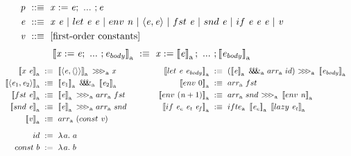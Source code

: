 \documentclass{llncs}
\newcommand{\arrowarr}{\ensuremath{arr}}
\newcommand{\arrowcomp}{\ensuremath{{>}\mspace{-6mu}{>}\mspace{-6mu}{>}}}
\newcommand{\arrowpair}{\ensuremath{\mathit{\&\mspace{-7.5mu}\&\mspace{-7.5mu}\&}}}
\newcommand{\arrowif}{\ensuremath{ifte}}
\newcommand{\gen}{_\mathrm{a}}
\begin{document}
\begin{figure*}[t]
\smallmathfont
\begin{align*}
	\mathit{p} &\ ::\equiv \ \mathit{x := e};\ ...\ ; \mathit{e} \\
	\mathit{e} &\ ::\equiv \ \mathit{x~e}\ |\ let~\mathit{e~e}\ |\ env~\mathit{n}\ |\ \mathit{\pair{e,e}}\ |\ fst~\mathit{e}\ |\ snd~\mathit{e}\ |\ if~\mathit{e~e~e}\ |\ \mathit{v} \\
	\mathit{v} &\ ::\equiv \ \text{[first-order constants]}
\end{align*}
\begin{equation*}
	\meaningof{\mathit{x} := \mathit{e};\ ...\ ; \mathit{e_{body}}}\gen \ :\equiv\
		\mathit{x} := \meaningof{\mathit{e}}\gen;\ ...\ ; \meaningof{\mathit{e_{body}}}\gen
\end{equation*}
\begin{align*}
\begin{aligned}[t]
	\meaningof{\mathit{x}~\mathit{e}}\gen &\ :\equiv\
		\meaningof{\pair{\mathit{e},\pair{}}}\gen~\arrowcomp\gen~\mathit{x}
\\
	\meaningof{\pair{\mathit{e}_1,\mathit{e}_2}}\gen &\ :\equiv\
		\meaningof{\mathit{e}_1}\gen~\arrowpair\gen~\meaningof{\mathit{e}_2}\gen
\\
	\meaningof{fst~\mathit{e}}\gen &\ :\equiv\
		\meaningof{\mathit{e}}\gen~\arrowcomp\gen~\arrowarr\gen~fst
\\
	\meaningof{snd~\mathit{e}}\gen &\ :\equiv\
		\meaningof{\mathit{e}}\gen~\arrowcomp\gen~\arrowarr\gen~snd
\\
	\meaningof{\mathit{v}}\gen &\ :\equiv\ \arrowarr\gen~(const~\mathit{v})
\\[6pt]
	id &\ := \ \fun{a} a
\\
	const~b &\ := \ \fun{a} b
\\
\end{aligned}
&\tab\tab\tab\tab
\begin{aligned}[t]
	\meaningof{let~\mathit{e}~\mathit{e_{body}}}\gen &\ :\equiv\ 
		(\meaningof{\mathit{e}}\gen~\arrowpair\gen~\arrowarr\gen~id)~
			\arrowcomp\gen~
		\meaningof{\mathit{e_{body}}}\gen
\\
	\meaningof{env~0}\gen &\ :\equiv\ \arrowarr\gen~fst
\\
	\meaningof{env~(\mathit{n}+1)}\gen &\ :\equiv\ \arrowarr\gen~snd~\arrowcomp\gen~\meaningof{env~\mathit{n}}\gen
\\
	\meaningof{if~\mathit{e_c}~\mathit{e_t}~\mathit{e_f}}\gen &\ :\equiv\
		\arrowif\gen~
			\meaningof{\mathit{e_c}}\gen~
			\meaningof{lazy~\mathit{e_t}}\gen~

\end{aligned}
\end{align*}
\end{figure*}
\end{document}
